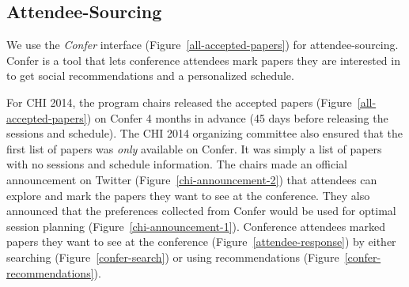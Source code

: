 \documentclass[letterpaper]{article}
\begin{document}
\subsection{Attendee-Sourcing}
We use the \emph{Confer} interface (Figure~\ref{all-accepted-papers}) for attendee-sourcing. Confer is a tool that lets conference attendees mark papers they are interested in to get social recommendations and a personalized schedule.

For CHI 2014, the program chairs released the accepted papers (Figure~\ref{all-accepted-papers}) on Confer 4 months in advance (45 days before releasing the sessions and schedule). The CHI 2014 organizing committee also ensured that the first list of papers was \emph{only} available on Confer. It was simply a list of papers with no sessions and schedule information. The chairs made an official announcement on Twitter (Figure~\ref{chi-announcement-2}) that attendees can explore and mark the papers they want to see at the conference. They also announced that the preferences collected from Confer would be used for optimal session planning (Figure~\ref{chi-announcement-1}). Conference attendees marked papers they want to see at the conference (Figure~\ref{attendee-response}) by either searching (Figure~\ref{confer-search}) or using recommendations (Figure~\ref{confer-recommendations}).
\end{document}
